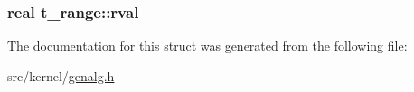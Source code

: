 \hypertarget{structt__range_a776b418fd21da7c1f31b9271bc51520d}{
\subsubsection[{rval}]{\setlength{\rightskip}{0pt plus 5cm}real {\bf t\-\_\-range\-::rval}}}\label{structt__range_a776b418fd21da7c1f31b9271bc51520d}


\-The documentation for this struct was generated from the following file\-:\begin{DoxyCompactItemize}
\item 
src/kernel/\hyperlink{genalg_8h}{genalg.\-h}\end{DoxyCompactItemize}
